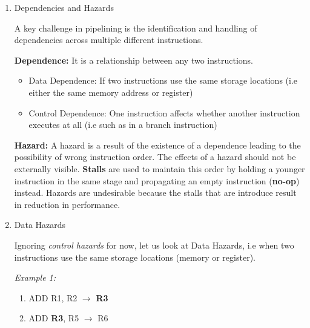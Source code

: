 \documentclass[12pt]{article}
\newenvironment{QandA}{\begin{enumerate}[label=\bfseries\alph*.]\bfseries}
                      {\end{enumerate}}
\newenvironment{answered}{\par\quad\normalfont}{}
\begin{document}
\begin{QandA}
\begin{answered}
    Therefore longer (deeper) pipelines show diminishing clock frequency gains. However, in our example, we can assume that our clock period = \textbf{10ns} + overheads = \textbf{12ns}. And let's say that our CPI = 1 + pipeline penalty = \textbf{1.5}. Our effective performance will then be \textbf{12ns $\times$ 1.5 = 18ns/insn}.
    \end{answered}
    
    \item Dependencies and Hazards
    \begin{answered}
    A key challenge in pipelining is the identification and handling of dependencies across multiple different instructions.
    
    \textbf{Dependence:} It is a relationship between any two instructions.
    
    \begin{itemize}
        \item Data Dependence: If two instructions use the same storage locations (i.e either the same memory address or register)
        \item Control Dependence: One instruction affects whether another instruction executes at all (i.e such as in a branch instruction)
    \end{itemize}
    
    \textbf{Hazard:} A hazard is a result of the existence of a dependence leading to the possibility of wrong instruction order. The effects of a hazard should not be externally visible. \textbf{Stalls} are used to maintain this order by holding a younger instruction in the same stage and propagating an empty instruction (\textbf{no-op}) instead. Hazards are undesirable because the stalls that are introduce result in reduction in performance.
    \end{answered}
    
    \item Data Hazards
    \begin{answered}
    Ignoring \textit{control hazards} for now, let us look at Data Hazards, i.e when two instructions use the same storage locations (memory or register). 
    
    \textit{Example 1:}
    \begin{enumerate}
        \item ADD R1, R2 $\rightarrow$ \textbf{R3}
        \item ADD \textbf{R3}, R5 $\rightarrow$ R6
    \end{enumerate}
    

\end{answered}
\end{QandA}
\end{document}
